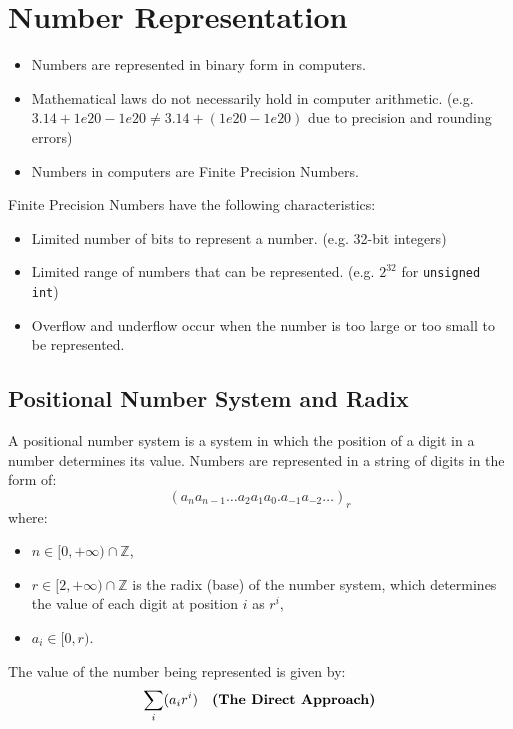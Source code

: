 \section{Number Representation}

\begin{itemize}
    \item Numbers are represented in binary form in computers.
    \item Mathematical laws do not necessarily hold in computer arithmetic.
          (e.g. $3.14 + 1e20 - 1e20 \neq 3.14 + (1e20 - 1e20)$ due to precision and rounding errors)
    \item Numbers in computers are Finite Precision Numbers.
\end{itemize}

\begin{definition}\label{def:finite-precision-numbers}
    Finite Precision Numbers have the following characteristics:
    \begin{itemize}
        \item Limited number of bits to represent a number. (e.g. 32-bit integers)
        \item Limited range of numbers that can be represented. (e.g. $2^{32}$ for \texttt{unsigned int})
        \item Overflow and underflow occur when the number is too large or too small to be represented.
    \end{itemize}
\end{definition}

\subsection{Positional Number System and Radix}

\begin{definition}\label{def:positional-number-system}
    A positional number system is a system in which the position of a digit in a number determines
    its value. Numbers are represented in a string of digits in the form of:
    \begin{equation*}
        (a_na_{n-1}\ldots a_2a_1a_0.a_{-1}a_{-2}\ldots)_r
    \end{equation*}
    where:
    \begin{itemize}
        \item $n\in[0, +\infty)\cap \mathbb{Z}$,
        \item $r\in[2, +\infty)\cap\mathbb{Z}$ is the radix (base) of the number system,
              which determines the value of each digit at position $i$ as $r^i$,
        \item $a_i\in[0, r)$.
    \end{itemize}

    The value of the number being represented is given by:
    \begin{equation}\label{eq:positional-number-system-value-direct}
        \sum_{i} (a_i r^i) \quad\text{\bfseries (The Direct Approach)}
    \end{equation}
\end{definition}

